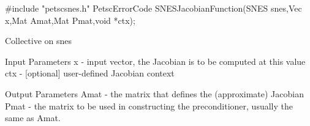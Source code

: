 #include "petscsnes.h"
PetscErrorCode SNESJacobianFunction(SNES snes,Vec x,Mat Amat,Mat Pmat,void *ctx);

Collective on snes

Input Parameters
x   - input vector, the Jacobian is to be computed at this value
ctx - [optional] user-defined Jacobian context

Output Parameters
Amat - the matrix that defines the (approximate) Jacobian
Pmat - the matrix to be used in constructing the preconditioner, usually the same as Amat. 
